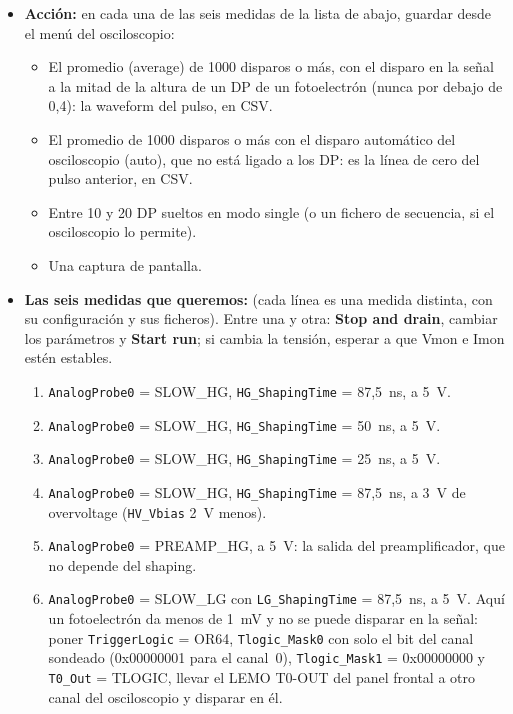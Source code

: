 \documentclass[11pt,a4paper]{article}
\begin{document}
\begin{itemize}
\item {\bf Acción:} en cada una de las seis medidas de la lista de abajo,
  guardar desde el menú del osciloscopio:
  \begin{itemize}
  \item El promedio (average) de 1000 disparos o más, con el disparo en la
    señal a la mitad de la altura de un DP de un fotoelectrón (nunca por
    debajo de 0,4): la waveform del pulso, en CSV.
  \item El promedio de 1000 disparos o más con el disparo automático del
    osciloscopio (auto), que no está ligado a los DP: es la línea de cero
    del pulso anterior, en CSV.
  \item Entre 10 y 20 DP sueltos en modo single (o un fichero de secuencia,
    si el osciloscopio lo permite).
  \item Una captura de pantalla.
  \end{itemize}
\item {\bf Las seis medidas que queremos:} (cada línea es una medida distinta, con su
  configuración y sus ficheros). Entre una y otra: {\bf Stop and drain},
  cambiar los parámetros y {\bf Start run}; si cambia la tensión, esperar a
  que Vmon e Imon estén estables.
  \begin{enumerate}
  \item \texttt{AnalogProbe0} = SLOW\_HG, \texttt{HG\_ShapingTime} =
    87,5~ns, a 5~V.
  \item \texttt{AnalogProbe0} = SLOW\_HG, \texttt{HG\_ShapingTime} = 50~ns,
    a 5~V.
  \item \texttt{AnalogProbe0} = SLOW\_HG, \texttt{HG\_ShapingTime} = 25~ns,
    a 5~V.
  \item \texttt{AnalogProbe0} = SLOW\_HG, \texttt{HG\_ShapingTime} =
    87,5~ns, a 3~V de overvoltage (\texttt{HV\_Vbias} 2~V menos).
  \item \texttt{AnalogProbe0} = PREAMP\_HG, a 5~V: la salida del
    preamplificador, que no depende del shaping.
  \item \texttt{AnalogProbe0} = SLOW\_LG con \texttt{LG\_ShapingTime} =
    87,5~ns, a 5~V. Aquí un fotoelectrón da menos de 1~mV y no se puede
    disparar en la señal: poner \texttt{TriggerLogic} = OR64,
    \texttt{Tlogic\_Mask0} con solo el bit del canal sondeado (0x00000001
    para el canal~0), \texttt{Tlogic\_Mask1} = 0x00000000 y
    \texttt{T0\_Out} = TLOGIC, llevar el LEMO T0-OUT del panel frontal a otro
    canal del osciloscopio y disparar en él.

\end{enumerate}
\end{itemize}
\end{document}
